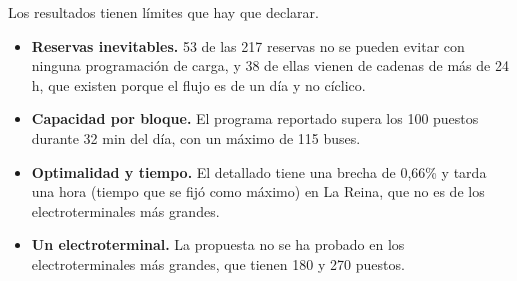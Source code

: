 Los resultados tienen límites que hay que declarar.
\begin{itemize}
    \item \textbf{Reservas inevitables.} 53 de las 217 reservas no se pueden evitar con ninguna programación de carga, y 38 de ellas vienen de cadenas de más de 24 h, que existen porque el flujo es de un día y no cíclico.
    \item \textbf{Capacidad por bloque.} El programa reportado supera los 100 puestos durante 32 min del día, con un máximo de 115 buses.
    \item \textbf{Optimalidad y tiempo.} El detallado tiene una brecha de 0,66\% y tarda una hora (tiempo que se fijó como máximo) en La Reina, que no es de los electroterminales más grandes.
    \item \textbf{Un electroterminal.} La propuesta no se ha probado en los electroterminales más grandes, que tienen 180 y 270 puestos.
\end{itemize}
